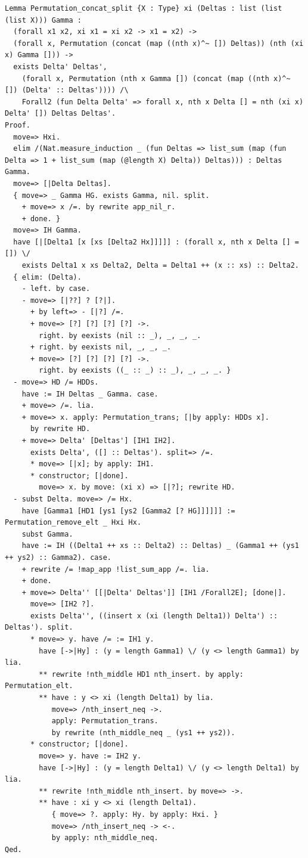 \begin{lstlisting}[style=authorcoq]
Lemma Permutation_concat_split {X : Type} xi (Deltas : list (list (list X))) Gamma :
  (forall x1 x2, xi x1 = xi x2 -> x1 = x2) ->
  (forall x, Permutation (concat (map ((nth x)^~ []) Deltas)) (nth (xi x) Gamma [])) ->
  exists Delta' Deltas',
    (forall x, Permutation (nth x Gamma []) (concat (map ((nth x)^~ []) (Delta' :: Deltas')))) /\
    Forall2 (fun Delta Delta' => forall x, nth x Delta [] = nth (xi x) Delta' []) Deltas Deltas'.
Proof.
  move=> Hxi.
  elim /(Nat.measure_induction _ (fun Deltas => list_sum (map (fun Delta => 1 + list_sum (map (@length X) Delta)) Deltas))) : Deltas Gamma.
  move=> [|Delta Deltas].
  { move=> _ Gamma HG. exists Gamma, nil. split.
    + move=> x /=. by rewrite app_nil_r.
    + done. }
  move=> IH Gamma.
  have [|[Delta1 [x [xs [Delta2 Hx]]]]] : (forall x, nth x Delta [] = []) \/
    exists Delta1 x xs Delta2, Delta = Delta1 ++ (x :: xs) :: Delta2.
  { elim: (Delta).
    - left. by case.
    - move=> [|??] ? [?|].
      + by left=> - [|?] /=.
      + move=> [?] [?] [?] [?] ->.
        right. by eexists (nil :: _), _, _, _.
      + right. by eexists nil, _, _, _.
      + move=> [?] [?] [?] [?] ->.
        right. by eexists ((_ :: _) :: _), _, _, _. }
  - move=> HD /= HDDs.
    have := IH Deltas _ Gamma. case.
    + move=> /=. lia.
    + move=> x. apply: Permutation_trans; [|by apply: HDDs x].
      by rewrite HD.
    + move=> Delta' [Deltas'] [IH1 IH2].
      exists Delta', ([] :: Deltas'). split=> /=.
      * move=> [|x]; by apply: IH1.
      * constructor; [|done].
        move=> x. by move: (xi x) => [|?]; rewrite HD.
  - subst Delta. move=> /= Hx.
    have [Gamma1 [HD1 [ys1 [ys2 [Gamma2 [? HG]]]]]] := Permutation_remove_elt _ Hxi Hx.
    subst Gamma.
    have := IH ((Delta1 ++ xs :: Delta2) :: Deltas) _ (Gamma1 ++ (ys1 ++ ys2) :: Gamma2). case.
    + rewrite /= !map_app !list_sum_app /=. lia.
    + done.
    + move=> Delta'' [[|Delta' Deltas']] [IH1 /Forall2E]; [done|].
      move=> [IH2 ?].
      exists Delta'', ((insert x (xi (length Delta1)) Delta') :: Deltas'). split.
      * move=> y. have /= := IH1 y.
        have [->|Hy] : (y = length Gamma1) \/ (y <> length Gamma1) by lia.
        ** rewrite !nth_middle HD1 nth_insert. by apply: Permutation_elt.
        ** have : y <> xi (length Delta1) by lia.
           move=> /nth_insert_neq ->.
           apply: Permutation_trans.
           by rewrite (nth_middle_neq _ (ys1 ++ ys2)).
      * constructor; [|done].
        move=> y. have := IH2 y.
        have [->|Hy] : (y = length Delta1) \/ (y <> length Delta1) by lia.
        ** rewrite !nth_middle nth_insert. by move=> ->.
        ** have : xi y <> xi (length Delta1).
           { move=> ?. apply: Hy. by apply: Hxi. }
           move=> /nth_insert_neq -> <-.
           by apply: nth_middle_neq.
Qed.


\end{lstlisting}
